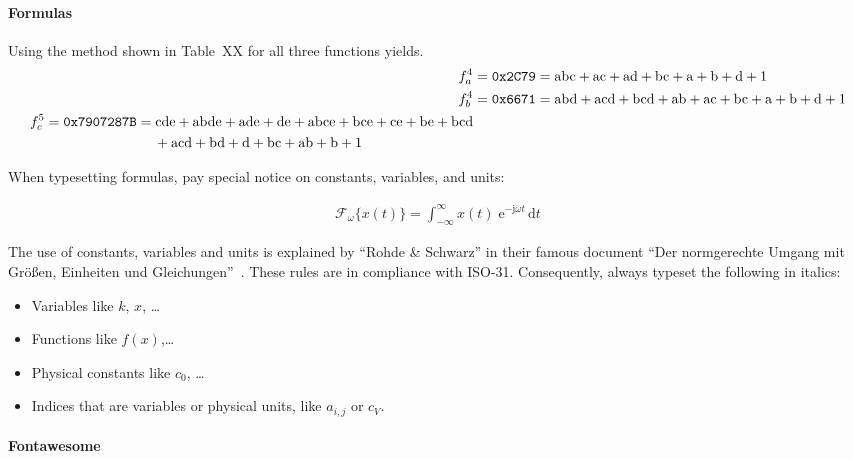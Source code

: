 \paragraph{Formulas}

Using the method shown in Table~XX for all three functions yields.
\begin{align}
f_a^4 &= \mathrm{\texttt{0x2C79}} = \mathrm{abc} + \mathrm{ac} + \mathrm{ad} + \mathrm{bc} + \mathrm{a} + \mathrm{b} + \mathrm{d} + \mathrm{1} \\
f_b^4 &= \mathrm{\texttt{0x6671}} = \mathrm{abd} + \mathrm{acd} + \mathrm{bcd} + \mathrm{ab} + \mathrm{ac} + \mathrm{bc} + \mathrm{a} + \mathrm{b} + \mathrm{d} + \mathrm{1}\\
\begin{split}
f_c^5 &= \mathrm{\texttt{0x7907287B}} = \mathrm{cde} + \mathrm{abde} + \mathrm{ade} + \mathrm{de} + \mathrm{abce} + \mathrm{bce} + \mathrm{ce} + \mathrm{be} + \mathrm{bcd}\\
&\hspace{2.75cm}+ \mathrm{acd} +\mathrm{bd} + \mathrm{d} + \mathrm{bc} + \mathrm{ab} + \mathrm{b} + \mathrm{1}
\end{split}
\end{align}

When typesetting formulas, pay special notice on constants, variables, and units:

 \begin{align}
  \mathcal{F}_{\omega}\{x(t)\} = \int^{\infty}_{-\infty} x(t) \;\mathrm{e}^{-\mathrm{j} \omega t}\,\mathrm{d}t
  \tag{Fourier-Transformation} %
  \end{align}

The use of constants, variables and units is explained by \enquote{Rohde \& Schwarz} in their famous document \enquote{Der normgerechte Umgang mit Gr\"{o}\ss{}en, Einheiten und Gleichungen}~\cite{msc:correctuse}. These rules are in compliance with ISO-31. Consequently, always typeset the following in italics:

\begin{itemize}
\item Variables like $k$, $x$, \dots
\item Functions like $f(x)$,\dots
\item Physical constants like $c_0$, \dots
\item Indices that are variables or physical units, like $a_{i, j}$ or $c_V$.
\end{itemize}


\paragraph{Fontawesome}

